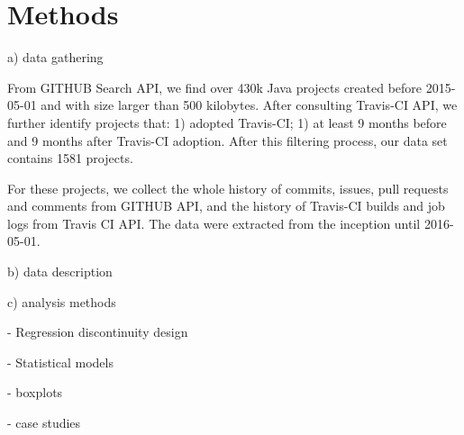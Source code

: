 \section{Methods}
\label{sec:method}

a) data gathering

From GITHUB Search API, we find over 430k Java projects created before 2015-05-01 and with size larger than 500 kilobytes. After consulting Travis-CI API, we further identify projects that: 1) adopted Travis-CI; 1) at least 9 months before and 9 months after Travis-CI adoption. After this filtering process, our data set contains 1581 projects. 

For these projects, we collect the whole history of commits, issues, pull requests and comments from GITHUB API, and the history of Travis-CI builds and job logs from Travis CI API.  The data were extracted from the inception until 2016-05-01.

b) data description

c) analysis methods

- Regression discontinuity design




- Statistical models

- boxplots

- case studies